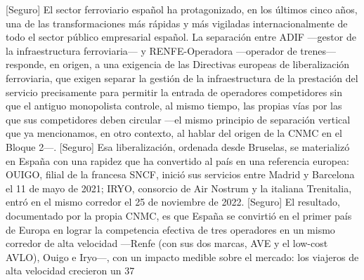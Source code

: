 \documentclass[10pt,a4paper]{article}
\begin{document}
[Seguro] El sector ferroviario español ha protagonizado, en los últimos cinco años, una de las transformaciones más rápidas y más vigiladas internacionalmente de todo el sector público empresarial español. La separación entre ADIF —gestor de la infraestructura ferroviaria— y RENFE-Operadora —operador de trenes— responde, en origen, a una exigencia de las Directivas europeas de liberalización ferroviaria, que exigen separar la gestión de la infraestructura de la prestación del servicio precisamente para permitir la entrada de operadores competidores sin que el antiguo monopolista controle, al mismo tiempo, las propias vías por las que sus competidores deben circular —el mismo principio de separación vertical que ya mencionamos, en otro contexto, al hablar del origen de la CNMC en el Bloque 2—. [Seguro] Esa liberalización, ordenada desde Bruselas, se materializó en España con una rapidez que ha convertido al país en una referencia europea: OUIGO, filial de la francesa SNCF, inició sus servicios entre Madrid y Barcelona el 11 de mayo de 2021; IRYO, consorcio de Air Nostrum y la italiana Trenitalia, entró en el mismo corredor el 25 de noviembre de 2022. [Seguro] El resultado, documentado por la propia CNMC, es que España se convirtió en el primer país de Europa en lograr la competencia efectiva de tres operadores en un mismo corredor de alta velocidad —Renfe (con sus dos marcas, AVE y el low-cost AVLO), Ouigo e Iryo—, con un impacto medible sobre el mercado: los viajeros de alta velocidad crecieron un 37%
\end{document}
